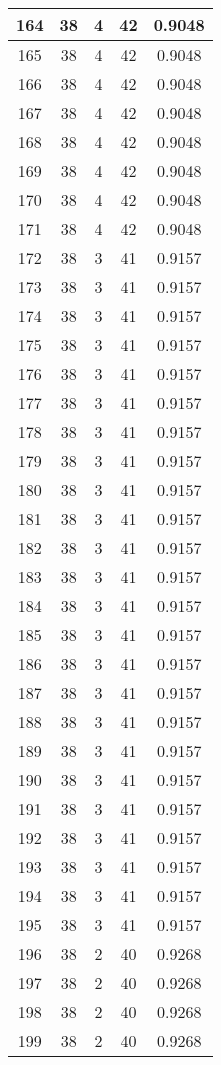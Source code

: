 \documentclass[letterpaper, 12pt]{article}
\begin{document}
\begin{longtable}{|c|c|c|c|c|}
\hline
164 & 38 & 4 & 42 & 0.9048 \\
\hline
165 & 38 & 4 & 42 & 0.9048 \\
\hline
166 & 38 & 4 & 42 & 0.9048 \\
\hline
167 & 38 & 4 & 42 & 0.9048 \\
\hline
168 & 38 & 4 & 42 & 0.9048 \\
\hline
169 & 38 & 4 & 42 & 0.9048 \\
\hline
170 & 38 & 4 & 42 & 0.9048 \\
\hline
171 & 38 & 4 & 42 & 0.9048 \\
\hline
172 & 38 & 3 & 41 & 0.9157 \\
\hline
173 & 38 & 3 & 41 & 0.9157 \\
\hline
174 & 38 & 3 & 41 & 0.9157 \\
\hline
175 & 38 & 3 & 41 & 0.9157 \\
\hline
176 & 38 & 3 & 41 & 0.9157 \\
\hline
177 & 38 & 3 & 41 & 0.9157 \\
\hline
178 & 38 & 3 & 41 & 0.9157 \\
\hline
179 & 38 & 3 & 41 & 0.9157 \\
\hline
180 & 38 & 3 & 41 & 0.9157 \\
\hline
181 & 38 & 3 & 41 & 0.9157 \\
\hline
182 & 38 & 3 & 41 & 0.9157 \\
\hline
183 & 38 & 3 & 41 & 0.9157 \\
\hline
184 & 38 & 3 & 41 & 0.9157 \\
\hline
185 & 38 & 3 & 41 & 0.9157 \\
\hline
186 & 38 & 3 & 41 & 0.9157 \\
\hline
187 & 38 & 3 & 41 & 0.9157 \\
\hline
188 & 38 & 3 & 41 & 0.9157 \\
\hline
189 & 38 & 3 & 41 & 0.9157 \\
\hline
190 & 38 & 3 & 41 & 0.9157 \\
\hline
191 & 38 & 3 & 41 & 0.9157 \\
\hline
192 & 38 & 3 & 41 & 0.9157 \\
\hline
193 & 38 & 3 & 41 & 0.9157 \\
\hline
194 & 38 & 3 & 41 & 0.9157 \\
\hline
195 & 38 & 3 & 41 & 0.9157 \\
\hline
196 & 38 & 2 & 40 & 0.9268 \\
\hline
197 & 38 & 2 & 40 & 0.9268 \\
\hline
198 & 38 & 2 & 40 & 0.9268 \\
\hline
199 & 38 & 2 & 40 & 0.9268 \\
\hline
\end{longtable}
\end{document}
